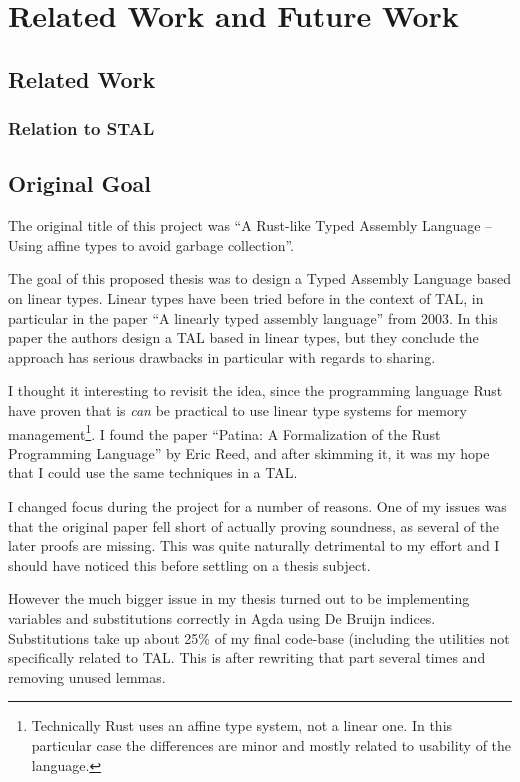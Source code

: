 \chapter{Related Work and Future Work}
\label{chap:future}
\section{Related Work}
\subsection{Relation to STAL}
\label{sec:rel-stal}

\section{Original Goal}

The original title of this project was ``A Rust-like Typed Assembly Language --
Using affine types to avoid garbage collection''.

The goal of this proposed thesis was to design a Typed Assembly Language based
on linear types. Linear types have been tried before in the context of TAL, in
particular in the paper ``A linearly typed assembly language''\cite{ltal} from
2003. In this paper the authors design a TAL based in linear types, but they
conclude the approach has serious drawbacks in particular with regards to
sharing.

I thought it interesting to revisit the idea, since the programming language
Rust\cite{rust} have proven that is \emph{can} be practical to use linear type
systems for memory management\footnote{Technically Rust uses an affine type
  system, not a linear one. In this particular case the differences are minor
  and mostly related to usability of the language.}. I found the paper ``Patina:
A Formalization of the Rust Programming Language''\cite{patina} by Eric Reed,
and after skimming it, it was my hope that I could use the same techniques in a
TAL.

I changed focus during the project for a number of reasons. One of my issues was
that the original paper fell short of actually proving soundness, as several of
the later proofs are missing. This was quite naturally detrimental to my effort
and I should have noticed this before settling on a thesis subject.

However the much bigger issue in my thesis turned out to be implementing
variables and substitutions correctly in Agda using De Bruijn
indices. Substitutions take up about 25\% of my final code-base (including the
utilities not specifically related to TAL. This is after rewriting that part
several times and removing unused lemmas.


